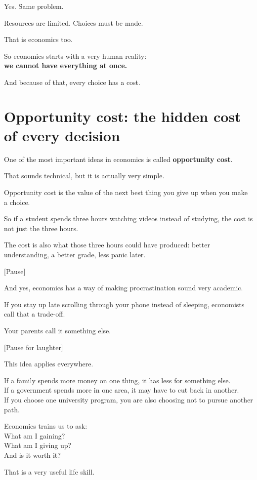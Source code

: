 \documentclass[12pt]{article}
\begin{document}
Yes. Same problem.

Resources are limited. Choices must be made.

That is economics too.

So economics starts with a very human reality:\\
\textbf{we cannot have everything at once.}

And because of that, every choice has a cost.

\section*{Opportunity cost: the hidden cost of every decision}

One of the most important ideas in economics is called \textbf{opportunity cost}.

That sounds technical, but it is actually very simple.

Opportunity cost is the value of the next best thing you give up when you make a choice.

So if a student spends three hours watching videos instead of studying, the cost is not just the three hours.

The cost is also what those three hours could have produced:
better understanding, a better grade, less panic later.

[Pause]

And yes, economics has a way of making procrastination sound very academic.

If you stay up late scrolling through your phone instead of sleeping, economists call that a trade-off.

Your parents call it something else.

[Pause for laughter]

This idea applies everywhere.

If a family spends more money on one thing, it has less for something else.\\
If a government spends more in one area, it may have to cut back in another.\\
If you choose one university program, you are also choosing not to pursue another path.

Economics trains us to ask:\\
What am I gaining?\\
What am I giving up?\\
And is it worth it?

That is a very useful life skill.
\end{document}
